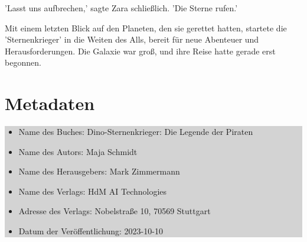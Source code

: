\documentclass[12pt]{article}
\begin{document}
'Lasst uns aufbrechen,' sagte Zara schließlich. 'Die Sterne rufen.'

Mit einem letzten Blick auf den Planeten, den sie gerettet hatten, startete die 'Sternenkrieger' in die Weiten des Alls, bereit für neue Abenteuer und Herausforderungen. Die Galaxie war groß, und ihre Reise hatte gerade erst begonnen.

\clearpage

\section*{Metadaten}
\colorbox{lightgray}{
    \begin{minipage}{\dimexpr\textwidth-2\fboxsep}
        \vspace{1cm}
        \begin{itemize}
            \item Name des Buches: Dino-Sternenkrieger: Die Legende der Piraten
            \item Name des Autors: Maja Schmidt
            \item Name des Herausgebers: Mark Zimmermann
            \item Name des Verlags: HdM AI Technologies
            \item Adresse des Verlags: Nobelstraße 10, 70569 Stuttgart
            \item Datum der Veröffentlichung: 2023-10-10
        \end{itemize}
        \vspace{1cm}
    \end{minipage}
}
\end{document}
